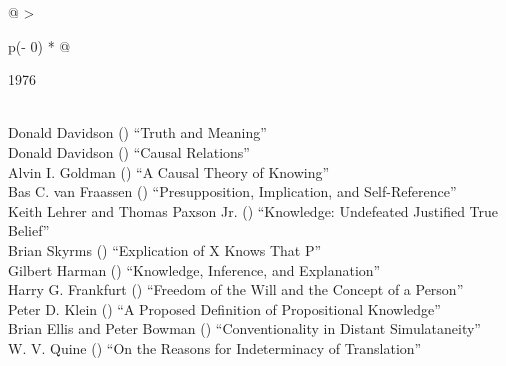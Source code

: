 \documentclass[
  10pt,
  letterpaper,
  DIV=11,
  numbers=noendperiod,
  twoside]{scrartcl}
\begin{document}
\begin{longtable}[]{@{}
  >{\raggedright\arraybackslash}p{(\columnwidth - 0\tabcolsep) * }@{}}

\caption{\label{tbl-top-ten-1967}Most cited articles published less than
ten years ago as of 1976.}

\tabularnewline

\toprule\noalign{}
\begin{minipage}[b]{\linewidth}\raggedright
1976
\end{minipage} \\
\midrule\noalign{}
\endhead
\bottomrule\noalign{}
\endlastfoot
Donald Davidson
()
``Truth and Meaning'' \\
Donald Davidson
()
``Causal Relations'' \\
Alvin I. Goldman
()
``A Causal Theory of Knowing'' \\
Bas C. van Fraassen
()
``Presupposition, Implication, and Self-Reference'' \\
Keith Lehrer and Thomas Paxson Jr.
()
``Knowledge: Undefeated Justified True Belief'' \\
Brian Skyrms
()
``Explication of X Knows That P'' \\
Gilbert Harman
()
``Knowledge, Inference, and Explanation'' \\
Harry G. Frankfurt
()
``Freedom of the Will and the Concept of a Person'' \\
Peter D. Klein
()
``A Proposed Definition of Propositional Knowledge'' \\
Brian Ellis and Peter Bowman
()
``Conventionality in Distant Simulataneity'' \\
W. V. Quine
()
``On the Reasons for Indeterminacy of Translation'' \\

\end{longtable}
\end{document}
